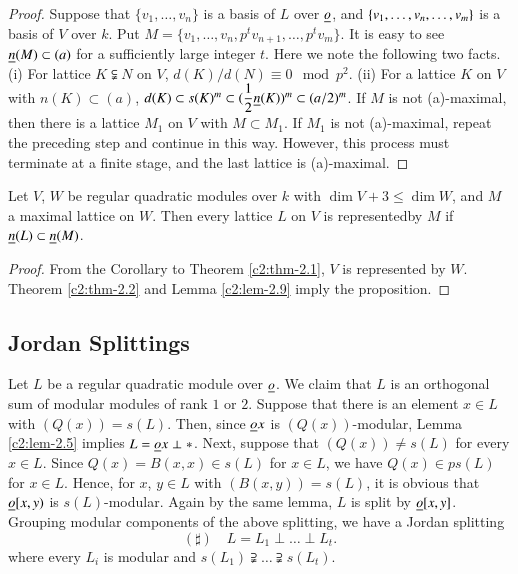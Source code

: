 \begin{proof}
Suppose that $\{v_{1},\ldots,v_{n}\}$ is a basis of $L$ over $\underline{o}$,
and $\{v_{1},\ldots,v_{n},\break\ldots,v_{m}\}$ is a basis of $V$ over
$k$. Put $M=\{v_{1},\ldots,v_{n},p^{t}v_{n+1},\ldots,p^{t}v_{m}\}$. It
is easy to see $\underline{n}(M)\subset (a)$ for a sufficiently large integer
$t$. Here we note the following two facts. (i) For lattice
$K\subsetneqq N$ on $V$, $d(K)/d(N)\equiv 0\mod
p^{2}$. (ii) For a lattice $K$ on $V$ with $n(K)\subset (a)$,
$d(K)\subset s(K)^{m}\subset (\dfrac{1}{2}\underline{n}(K))^{m}\subset
(a/2)^{m}$. If $M$ is not (a)-maximal, then there is a lattice $M_{1}$
on $V$ with $M\subset M_{1}$. If $M_{1}$ is not (a)-maximal, repeat
the preceding step and continue in this way. However, this process
must terminate at a finite stage, and the last lattice is (a)-maximal.  
\end{proof}

\setcounter{prop}{9}
\begin{prop}\label{c2:prop-2.10}
Let $V$, $W$ be regular quadratic modules over $k$ with $\dim V+3\leq
\dim W$, and $M$ a maximal lattice on $W$. Then every lattice $L$ on
$V$ is represented\pageoriginale by $M$ if $\underline{n}(L)\subset \underline{n}(M)$.
\end{prop}

\begin{proof}
From the Corollary to Theorem \ref{c2:thm-2.1}, $V$ is represented by
$W$. Theorem \ref{c2:thm-2.2} and Lemma \ref{c2:lem-2.9} imply the proposition.
\end{proof}

\subsection{Jordan Splittings}\label{c2:subsec2.1.3}

Let $L$ be a regular quadratic module over $\underline{o}$. We claim that $L$
is an orthogonal sum of modular modules of rank $1$ or $2$. Suppose
that there is an element $x\in L$ with $(Q(x))=s(L)$. Then, since
$\underline{o}x$ is $(Q(x))$-modular, Lemma \ref{c2:lem-2.5} implies
$L=\underline{o}x\perp \ast$. Next, suppose that $(Q(x))\neq s(L)$ for every
$x\in L$. Since $Q(x)=B(x,x)\in s(L)$ for $x\in L$, we have $Q(x)\in
ps(L)$ for $x\in L$. Hence, for $x$, $y\in L$ with $(B(x,y))=s(L)$, it
is obvious that $\underline{o}[x,y)$ is $s(L)$-modular. Again by the same
  lemma, $L$ is split by $\underline{o}[x,y]$. Grouping modular components of
  the above splitting, we have a Jordan splitting
$$
(\sharp)\quad L=L_{1}\perp\ldots\perp L_{t}.
$$
where every $L_{i}$ is modular and
$s(L_{1})\supsetneqq \ldots
\supsetneqq s(L_{t})$. 


